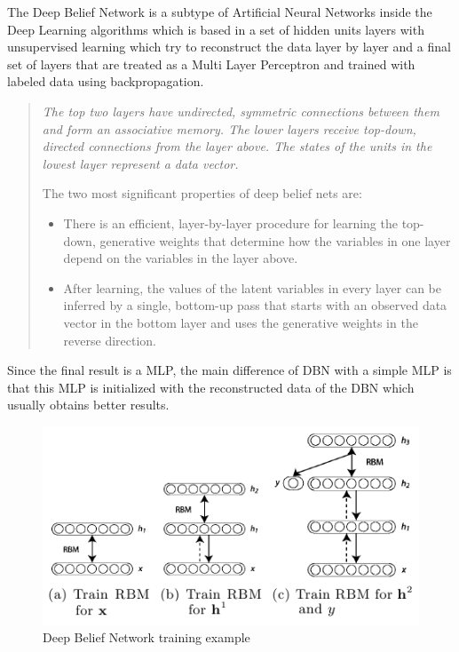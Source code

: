 \documentclass[a4paper,openany,oneside,12pt]{book}
\begin{document}
The Deep Belief Network is a subtype of Artificial Neural Networks inside the Deep Learning algorithms which is based in a set of hidden units layers with unsupervised learning which try to reconstruct the data layer by layer and a final set of layers that are treated as a Multi Layer Perceptron and trained with labeled data using backpropagation.
\begin{quote}
\em The top two layers have undirected, symmetric connections between them and form an associative memory. The lower layers receive top-down, directed connections from the layer above. The states of the units in the lowest layer represent a data vector.

The two most significant properties of deep belief nets are:

\begin{itemize}
\item There is an efficient, layer-by-layer procedure for learning the top-down, generative weights that determine how the variables in one layer depend on the variables in the layer above. 

\item After learning, the values of the latent variables in every layer can be inferred by a single, bottom-up pass that starts with an observed data vector in the bottom layer and uses the generative weights in the reverse direction.\cite{Hinton:2009}
\end{itemize}
\end{quote}

Since the final result is a MLP, the main difference of DBN with a simple MLP is that this MLP is initialized with the reconstructed data of the DBN which usually obtains better results.


\begin{figure}
\centering
\includegraphics[width=\textwidth]{img/dbn_model.png} 
\caption{Deep Belief Network training example} \label{fig:dbn}
\end{figure}
\end{document}
